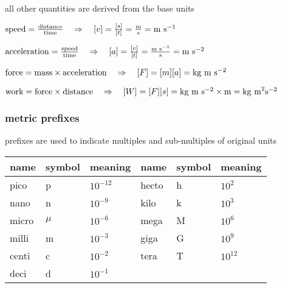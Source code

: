 all other quantities are derived from the base units

\newpage


\sol $\text{speed} = \frac{\text{distance}}{\text{time}} \quad \Rightarrow \quad [v] = \frac{[s]}{[t]} = \frac{\text{m}}{\text{s}} = \text{m s}^{-1}$
	
	$\text{acceleration} = \frac{\text{speed}}{\text{time}} \quad \Rightarrow \quad [a] = \frac{[v]}{[t]} = \frac{\text{m s}^{-1}}{\text{s}} = \text{m s}^{-2}$ 

	$\text{force} = \text{mass} \times \text{acceleration} \quad \Rightarrow \quad [F] = [m][a] = \text{kg}\text{ m s$^{-2}$} $ 
	
	$\text{work} = \text{force} \times \text{distance} \quad \Rightarrow \quad [W] = [F][s] = \text{kg}\text{ m s$^{-2}$} \times \text{m} = \text{kg m}^2 \text{s}^{-2}$ \eoe



\subsubsection{metric prefixes}

prefixes are used to indicate multiples and sub-multiples of original units

\begin{center}
	\begin{tabular}{|C{1.8cm}|C{1.8cm}|C{1.8cm}||C{1.8cm}|C{1.8cm}|C{1.8cm}|}
		\hline name & symbol & meaning & name & symbol & meaning \\ 
		\hline pico & p & $10^{-12}$ & hecto & h & $10^{2}$\\ 
		\hline nano & n & $10^{-9}$ & kilo & k & $10^{3}$\\ 
		\hline micro & $\mu$ & $10^{-6}$ & mega & M & $10^{6}$\\ 
		\hline milli & m & $10^{-3}$ & giga & G & $10^{9}$\\ 
		\hline centi & c & $10^{-2}$ & tera & T & $10^{12}$\\ 
		\hline deci & d & $10^{-1}$ & & &\\ 
		\hline 
	\end{tabular} 
\end{center}

%
%	
%	
%	

